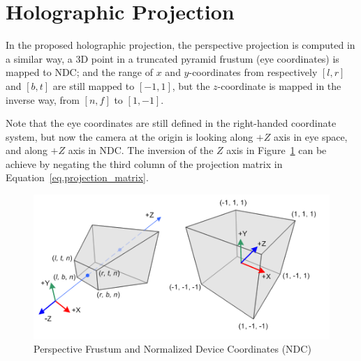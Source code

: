 \section{Holographic Projection}
\label{sec.hologram_projection}

In the proposed holographic projection, the perspective projection is computed in a similar way, a 3D point in a truncated pyramid frustum (eye coordinates) is mapped to NDC; and the range of $x$ and $y$-coordinates from respectively $[l, r]$ and $[b, t]$ are still mapped to $[-1, 1]$, but the $z$-coordinate is mapped in the inverse way, from $[n, f]$ to $[1, -1]$. 

Note that the eye coordinates are still defined in the right-handed coordinate system, but now the camera at the origin is looking along $+Z$ axis in eye space, and along $+Z$ axis in NDC. The inversion of the $Z$  axis in Figure~\ref{fig.new_projection01} can be achieve by negating the third column of the projection matrix in Equation~\ref{eq.projection_matrix}.


\begin{figure}[h!]
\centering
\includegraphics[width=0.9\linewidth,keepaspectratio=true]{figs/new_gl_projectionmatrix01.png}
\caption{Perspective Frustum and Normalized Device Coordinates (NDC)}
\label{fig.new_projection01}
\end{figure}




